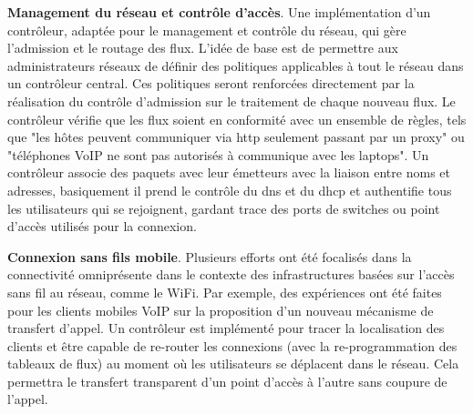 \textbf{Management du réseau et contrôle d'accès}.
Une implémentation d'un contrôleur, adaptée pour le management et contrôle du réseau, qui gère l'admission et le routage des flux. L'idée de base est de permettre aux administrateurs réseaux de définir des politiques applicables à tout le réseau dans un contrôleur central. Ces politiques seront renforcées directement par la réalisation du contrôle d'admission sur le traitement de chaque nouveau flux. Le contrôleur vérifie que les flux soient en conformité avec un ensemble de règles, tels que "les hôtes peuvent communiquer via \gls{http} seulement passant par un proxy" ou "téléphones VoIP ne sont pas autorisés à communique avec les laptops". Un contrôleur associe des paquets avec leur émetteurs avec la liaison entre noms et adresses, basiquement il prend le contrôle du \gls{dns} et du \gls{dhcp} et authentifie tous les utilisateurs qui se rejoignent, gardant trace des ports de switches ou point d'accès utilisés pour la connexion.


\textbf{Connexion sans fils mobile}.
Plusieurs efforts ont été focalisés dans la connectivité omniprésente dans le contexte des infrastructures basées sur l'accès sans fil au réseau, comme le WiFi. Par exemple, des expériences ont été faites pour les clients mobiles VoIP sur la proposition d'un nouveau mécanisme de transfert d'appel. Un contrôleur est implémenté pour tracer la localisation des clients et être capable de re-router les connexions (avec la re-programmation des tableaux de flux) au moment où les utilisateurs se déplacent dans le réseau. Cela permettra le transfert transparent d'un point d'accès à l'autre sans coupure de l'appel. \cite{OpenFlowStanfordUsing}


